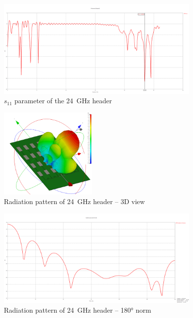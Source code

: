 \begin{figure}[h!]
  \centering
  \includegraphics[width=0.9\textwidth]{../img/s11.png}
  \caption[$s_{11}$ parameter of the 24~GHz header]{$s_{11}$ parameter of the 24~GHz header}
  \label{fig:s11}
\end{figure}


\begin{figure}[h!]
  \centering
  \includegraphics[width=0.43\textwidth]{../img/farfield3d.png}
  \caption[Radiation pattern of 24~GHz header -- 3D view]{Radiation pattern of 24~GHz header -- 3D view}
  \label{fig:farfield3d}
\end{figure}

\begin{figure}[h!]
  \centering
  \includegraphics[width=0.9\textwidth]{../img/farfield180.png}
  \caption[Radiation pattern of 24~GHz header -- 180° norm]{Radiation pattern of 24~GHz header -- 180° norm}
  \label{fig:farfield180}
\end{figure}

